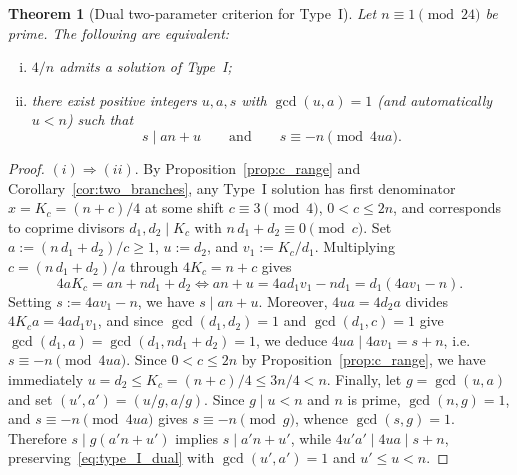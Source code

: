 \documentclass[11pt, a4paper]{article}
\theoremstyle{plain}
\newtheorem{theorem}{Theorem}[section]
\theoremstyle{definition}
\begin{document}
\begin{theorem}[Dual two-parameter criterion for Type~I]\label{thm:type_I_two_parameter}
Let $n\equiv1\pmod{24}$ be prime. The following are equivalent:
\begin{enumerate}[(i)]
    \item $4/n$ admits a solution of Type~I;
    \item there exist positive integers $u,a,s$ with $\gcd(u,a)=1$ (and automatically $u<n$) such that
    \begin{equation}\label{eq:type_I_dual}
    s\mid an+u \qquad\text{and}\qquad s\equiv -n \pmod{4ua}.
    \end{equation}
\end{enumerate}
\end{theorem}
\begin{proof}
$(i)\Rightarrow(ii)$. By Proposition~\ref{prop:c_range} and Corollary~\ref{cor:two_branches}, any Type~I solution has first denominator $x=K_c=(n+c)/4$ at some shift $c\equiv3\pmod4$, $0<c\le2n$, and corresponds to coprime divisors $d_1,d_2\mid K_c$ with $n\,d_1+d_2\equiv0\pmod c$. Set $a:=(n\,d_1+d_2)/c\ge1$, $u:=d_2$, and $v_1:=K_c/d_1$. Multiplying $c=(n\,d_1+d_2)/a$ through $4K_c=n+c$ gives
$$4a K_c = a n + n d_1 + d_2 \iff a n + u = 4a d_1 v_1 - n d_1 = d_1(4a v_1 - n).$$
Setting $s:=4a v_1 - n$, we have $s\mid an+u$. Moreover, $4ua = 4 d_2 a$ divides $4 K_c a = 4a d_1 v_1$, and since $\gcd(d_1,d_2)=1$ and $\gcd(d_1,c)=1$ give $\gcd(d_1,a)=\gcd(d_1,n d_1+d_2)=1$, we deduce $4ua\mid 4a v_1 = s+n$, i.e.\ $s\equiv-n\pmod{4ua}$. Since $0<c\le 2n$ by Proposition~\ref{prop:c_range}, we have immediately $u=d_2\le K_c=(n+c)/4\le 3n/4<n$. Finally, let $g=\gcd(u,a)$ and set $(u',a')=(u/g,a/g)$. Since $g\mid u<n$ and $n$ is prime, $\gcd(n,g)=1$, and $s\equiv -n\pmod{4ua}$ gives $s\equiv -n\pmod g$, whence $\gcd(s,g)=1$. Therefore $s\mid g(a'n+u')$ implies $s\mid a'n+u'$, while $4u'a'\mid 4ua\mid s+n$, preserving~\eqref{eq:type_I_dual} with $\gcd(u',a')=1$ and $u'\le u<n$.


\end{proof}
\end{document}
